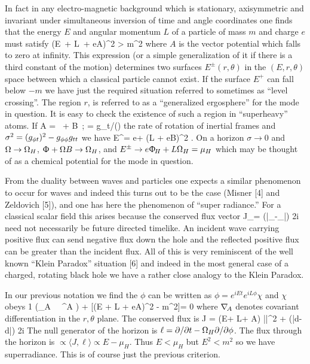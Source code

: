 In fact in any electro-magnetic background which is stationary, axisymmetric and
invariant under simultaneous inversion of time and angle coordinates one finds that the
energy $E$ and angular momentum $L$ of a particle of mass $m$ and charge $e$ must satisfy
\be
(E\, \dt + L\, \dphi + eA)^2 > m^2
\ee
where $A$ is the vector potential which falls to zero at infinity.
This expression (or a simple generalization of it if there is a third constant of the motion)
determines two surfaces $E^{\pm} (r,\theta)$ in the $(E, r, \theta)$ space between which
a classical particle cannot exist. If the surface $E^+$ can fall below $- m$ we have just the
required situation referred to sometimes as ``level crossing''. The region $r$,
is referred to as a ``generalized ergosphere'' for the mode in question.
It is easy to check the existence of such a region in ``superheavy'' atoms. If
\be
A = \Phi\, \dt + B\, \dphi; \quad \Omega = g_{\phi t}/(\gtt)
\ee
the rate of rotation of inertial frames and $\sigma^2 = (g_{\phi t})^2 - g_{\phi\phi}g_{tt}$ we have
\be
E^\pm = e\Phi + (L + eB)\Omega \pm \sigma^2  .
\ee
\ni
On a horizon $\sigma\rightarrow 0$ and $\Omega \rightarrow \Omega_H$, $\Upphi + \Omega B \rightarrow \Omega_H$, and
$E^\pm \rightarrow e \Upphi_{\!H} + L \Omega_H = \mu_H$
which may be thought of as a chemical potential for the mode in question.

From the duality between waves and particles one expects a similar phenomenon to occur for waves and indeed this turns out to be the case (Misner [4] and Zeldovich [5]), and one has here the phenomenon of ``super radiance.'' For a classical scalar ﬁeld this arises because the conserved flux vector
\be
J_\mu = {(\bar\phi\grad_{\!\mu}\phi-\phi\grad_{\!\mu}\bar\phi) \over 2i}
\ee
need not necessarily be future directed timelike. An incident wave carrying positive flux can send negative flux down the hole and the reflected positive flux can be greater than the incident flux. All of this is very reminiscent of the well known ``Klein Paradox'' situation [6] and indeed in the most general case of a charged, rotating black hole we have a rather close analogy to the Klein Paradox. 

In our previous notation we find the $\phi$ can be written as $\phi = e^{iEt}e^{iL\phi}\chi$ and $\chi$ obeys
\be
{1 \over \sigma}(\grad_A \, \sigma \, \grad^A \chi) + {[(E \dt + L \dphi + eA)^2 - m^2]}\chi = 0
\ee
where $\grad_A$ denotes covariant differentiation in the $r, \theta$ plane. The conserved flux is
\be
J = (E\dt + L\dphi + A) |\chi|^2 + {(\bar\chi d\chi - \chi d\bar\chi) \over 2i}
\ee
The null generator of the horizon is $\ell = \partial / \partial t - \Omega_H \partial/\partial\phi$.
The flux through the horizon is $\propto \langle J, \ell \rangle \propto E - \mu_H$. Thus $E < \mu_H$
but $E^2 < m^2$ so we have superradiance. This is of course just the previous criterion.

